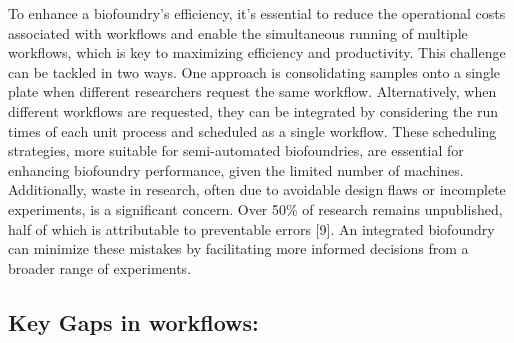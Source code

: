 \documentclass[
  letterpaper,
]{book}
\begin{document}
To enhance a biofoundry's efficiency, it's essential to reduce the
operational costs associated with workflows and enable the simultaneous
running of multiple workflows, which is key to maximizing efficiency and
productivity. This challenge can be tackled in two ways. One approach is
consolidating samples onto a single plate when different researchers
request the same workflow. Alternatively, when different workflows are
requested, they can be integrated by considering the run times of each
unit process and scheduled as a single workflow. These scheduling
strategies, more suitable for semi-automated biofoundries, are essential
for enhancing biofoundry performance, given the limited number of
machines. Additionally, waste in research, often due to avoidable design
flaws or incomplete experiments, is a significant concern. Over 50\% of
research remains unpublished, half of which is attributable to
preventable errors {[}9{]}. An integrated biofoundry can minimize these
mistakes by facilitating more informed decisions from a broader range of
experiments.

\subsection{Key Gaps in workflows:}\label{key-gaps-in-workflows}
\end{document}
